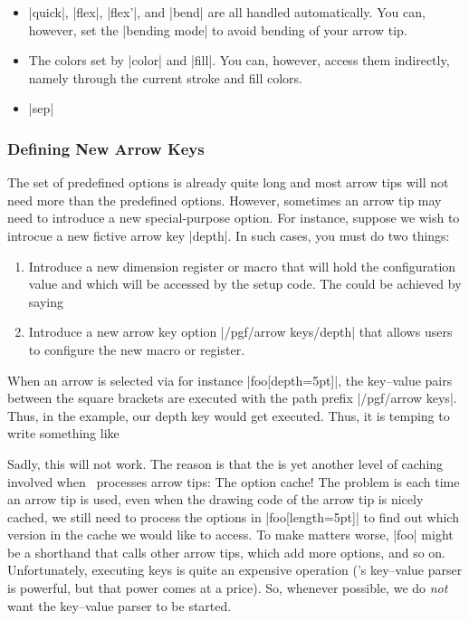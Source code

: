 \begin{itemize}
\item |quick|, |flex|, |flex'|, and |bend| are all handled
  automatically. You can, however, set the |bending mode| to avoid
  bending of your arrow tip.
\item The colors set by |color| and |fill|. You can, however, access
  them indirectly, namely through the current stroke and fill colors.
\item |sep|
\end{itemize}


\subsubsection{Defining New Arrow Keys}
\label{section-arrow-option-cache}

The set of predefined options is already quite long and most arrow
tips will not need more than the predefined options. However,
sometimes an arrow tip may need to introduce a new special-purpose
option. For instance, suppose we wish to introcue a new fictive arrow
key |depth|. In such cases, you must do two things:

\begin{enumerate}
\item
  Introduce a new dimension register or macro that will hold the
  configuration value and which will be accessed by the setup
  code. The could be achieved by saying
\begin{codeexample}
\newdimen\pgfarrowdepth
\end{codeexample}
\item
  Introduce a new arrow key option |/pgf/arrow keys/depth| that allows
  users to configure the new macro or register.
\end{enumerate}

When an arrow is selected via for instance |foo[depth=5pt]|, the
key--value pairs between the square brackets are executed with the
path prefix |/pgf/arrow keys|. Thus, in the example, our depth key
would get executed. Thus, it is temping to write something like
\begin{codeexample}
\end{codeexample}

Sadly, this will not work. The reason is that the is yet another level
of caching involved when \pgfname\ processes arrow tips: The option
cache! The problem is each time an arrow tip is used, even when the
drawing code of the arrow tip is nicely cached, we still need to
process the options in |foo[length=5pt]| to find out which version in
the cache we would like to access. To make matters worse, |foo| might
be a shorthand that calls other arrow tips, which add more options,
and so on. Unfortunately, executing keys is quite an expensive
operation (\pgfname's key--value parser is powerful, but that power
comes at a price). So, whenever possible, we do \emph{not} want the
key--value parser to be started.


